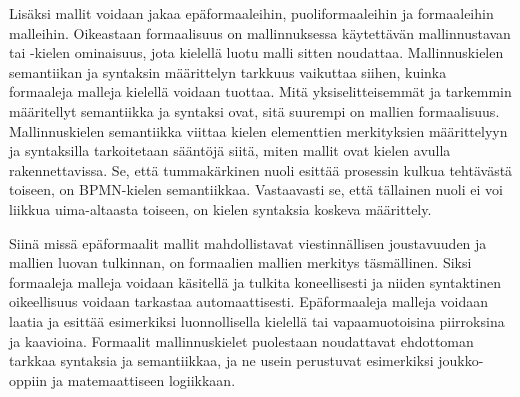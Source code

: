 \documentclass[
  finnish,
  letterpaper,
  DIV=11,
  numbers=noendperiod,
  oneside]{scrreprt}
\begin{document}
Lisäksi mallit voidaan jakaa epäformaaleihin, puoliformaaleihin ja
formaaleihin malleihin. Oikeastaan formaalisuus on mallinnuksessa
käytettävän mallinnustavan tai -kielen ominaisuus, jota kielellä luotu
malli sitten noudattaa. Mallinnuskielen semantiikan ja
syntaksin määrittelyn tarkkuus vaikuttaa
siihen, kuinka formaaleja malleja kielellä voidaan tuottaa. Mitä
yksiselitteisemmät ja tarkemmin määritellyt semantiikka ja syntaksi
ovat, sitä suurempi on mallien formaalisuus. Mallinnuskielen semantiikka
viittaa kielen elementtien merkityksien määrittelyyn ja syntaksilla
tarkoitetaan sääntöjä siitä, miten mallit ovat kielen avulla
rakennettavissa. Se, että tummakärkinen nuoli esittää prosessin kulkua
tehtävästä toiseen, on BPMN-kielen semantiikkaa. Vastaavasti se, että
tällainen nuoli ei voi liikkua uima-altaasta toiseen, on kielen
syntaksia koskeva määrittely.

Siinä missä epäformaalit mallit mahdollistavat viestinnällisen
joustavuuden ja mallien luovan tulkinnan, on formaalien mallien merkitys
täsmällinen. Siksi formaaleja malleja voidaan käsitellä ja tulkita
koneellisesti ja niiden syntaktinen oikeellisuus voidaan tarkastaa
automaattisesti. Epäformaaleja malleja voidaan laatia ja esittää
esimerkiksi luonnollisella kielellä tai vapaamuotoisina piirroksina ja
kaavioina. Formaalit mallinnuskielet puolestaan noudattavat ehdottoman
tarkkaa syntaksia ja semantiikkaa, ja ne usein perustuvat esimerkiksi
joukko-oppiin ja matemaattiseen logiikkaan.
\end{document}
